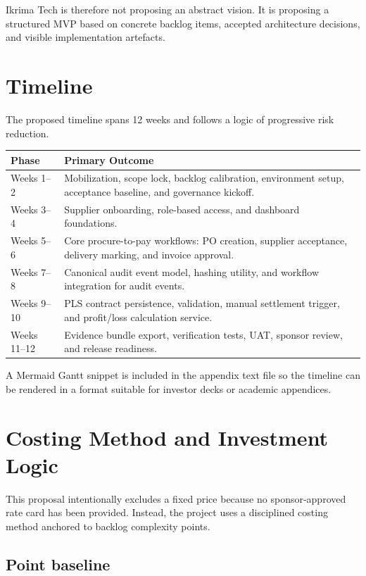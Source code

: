 \documentclass[11pt,a4paper]{article}
\begin{document}
Ikrima Tech is therefore not proposing an abstract vision. It is proposing a structured MVP based on concrete backlog items, accepted architecture decisions, and visible implementation artefacts.

\section{Timeline}

The proposed timeline spans 12 weeks and follows a logic of progressive risk reduction.

\begin{longtable}{p{3cm}p{11cm}}
\toprule
\textbf{Phase} & \textbf{Primary Outcome} \\
\midrule
Weeks 1--2 & Mobilization, scope lock, backlog calibration, environment setup, acceptance baseline, and governance kickoff. \\
Weeks 3--4 & Supplier onboarding, role-based access, and dashboard foundations. \\
Weeks 5--6 & Core procure-to-pay workflows: PO creation, supplier acceptance, delivery marking, and invoice approval. \\
Weeks 7--8 & Canonical audit event model, hashing utility, and workflow integration for audit events. \\
Weeks 9--10 & PLS contract persistence, validation, manual settlement trigger, and profit/loss calculation service. \\
Weeks 11--12 & Evidence bundle export, verification tests, UAT, sponsor review, and release readiness. \\
\bottomrule
\end{longtable}

A Mermaid Gantt snippet is included in the appendix text file so the timeline can be rendered in a format suitable for investor decks or academic appendices.

\section{Costing Method and Investment Logic}

This proposal intentionally excludes a fixed price because no sponsor-approved rate card has been provided. Instead, the project uses a disciplined costing method anchored to backlog complexity points.

\subsection{Point baseline}
\end{document}
